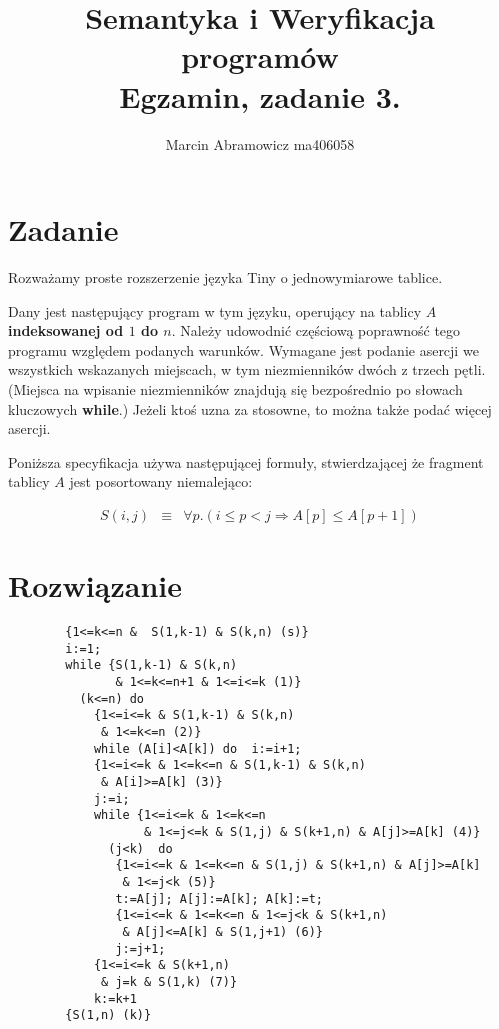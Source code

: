 \documentclass[final,11pt]{article}
\title{
   Semantyka i Weryfikacja programów \\
   \large Egzamin, zadanie 3.
}
\author{Marcin Abramowicz ma406058}
\begin{document}
   \lstset{language=whileprograms} 

   \maketitle

   \section{Zadanie}

   Rozważamy proste rozszerzenie języka {\sc Tiny} o jednowymiarowe
   tablice.

   Dany jest następujący program w tym języku, operujący na tablicy
   $A$ {\bf indeksowanej od $1$ do $n$}.
   Należy udowodnić częściową poprawność
   tego programu względem
   podanych warunków. Wymagane jest podanie asercji we wszystkich wskazanych miejscach, w tym niezmienników dwóch z trzech pętli. (Miejsca na wpisanie niezmienników znajdują się bezpośrednio po słowach kluczowych {\bf while}.) Jeżeli ktoś uzna za stosowne, to można także podać więcej asercji.

   Poniższa specyfikacja używa następującej formuły, stwierdzającej że fragment tablicy $A$ jest posortowany niemalejąco:

   \begin{eqnarray*}
      S(i,j) &\equiv&  \forall p. (i\leq p<j \Rightarrow A[p]\leq A[p+1])
   \end{eqnarray*}

   \newpage
   \section{Rozwiązanie}

   \begin{lstlisting}
        {1<=k<=n &  S(1,k-1) & S(k,n) (s)}
        i:=1;
        while {S(1,k-1) & S(k,n)
               & 1<=k<=n+1 & 1<=i<=k (1)}
          (k<=n) do
            {1<=i<=k & S(1,k-1) & S(k,n)
             & 1<=k<=n (2)}
            while (A[i]<A[k]) do  i:=i+1;
            {1<=i<=k & 1<=k<=n & S(1,k-1) & S(k,n)
             & A[i]>=A[k] (3)}
            j:=i;
            while {1<=i<=k & 1<=k<=n
                   & 1<=j<=k & S(1,j) & S(k+1,n) & A[j]>=A[k] (4)}
              (j<k)  do
               {1<=i<=k & 1<=k<=n & S(1,j) & S(k+1,n) & A[j]>=A[k]
                & 1<=j<k (5)}
               t:=A[j]; A[j]:=A[k]; A[k]:=t;
               {1<=i<=k & 1<=k<=n & 1<=j<k & S(k+1,n)
                & A[j]<=A[k] & S(1,j+1) (6)}
               j:=j+1;
            {1<=i<=k & S(k+1,n)
             & j=k & S(1,k) (7)}
            k:=k+1
        {S(1,n) (k)}
   \end{lstlisting}
\end{document}
